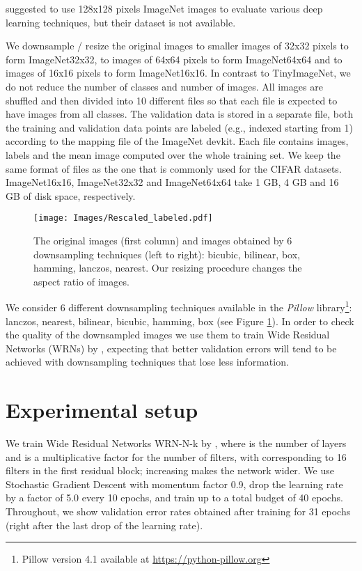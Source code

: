\documentclass{article} \usepackage{iclr2017_conference,times}
\begin{document}
\cite{mishkin2016systematic} suggested to use 128x128 pixels  ImageNet images to evaluate various deep learning  techniques, but their dataset is not available. 

We downsample / resize the original images to smaller images of 32x32 pixels to form ImageNet32x32, to images of 64x64 pixels to form ImageNet64x64 and to images of 16x16 pixels to form ImageNet16x16. In contrast to TinyImageNet, we do not reduce the number of classes and number of images. All images are shuffled and then divided into 10 different files so that each file is expected to have images from all classes. The validation data is stored in a separate file, both the training and validation data points are labeled (e.g., indexed starting from 1) according to the mapping file of the  ImageNet devkit. Each file contains images, labels and the mean image computed over the whole training set. We keep the same format of files as the one that is commonly used for the CIFAR datasets. ImageNet16x16, ImageNet32x32 and ImageNet64x64 take 1 GB, 4 GB  and 16 GB of disk space, respectively.


\begin{figure}[b]
\begin{center}
\texttt{[image: Images/Rescaled\_labeled.pdf]}
\end{center}
\caption{The original images (first column) and images obtained by 6 downsampling techniques (left to right): bicubic, bilinear, box, hamming, lanczos, nearest. Our resizing procedure changes the aspect ratio of images.}
\label{Figure1}
\end{figure}

We consider 6 different downsampling techniques available in the \textit{Pillow} library\footnote{Pillow version 4.1 available at \url{https://python-pillow.org}}: lanczos, nearest, bilinear, bicubic, hamming, box (see Figure \ref{Figure1}). In order to check the quality of the downsampled images we use them to train Wide Residual Networks (WRNs) by \cite{zagoruyko2016wide}, expecting that better validation errors will tend to be achieved with downsampling techniques that lose less information.


\section{Experimental setup}



We train Wide Residual Networks WRN-N-k by \cite{zagoruyko2016wide}, where  is the number of layers and  is a multiplicative factor for the number of filters, with  corresponding to 16 filters in the first residual block; increasing  makes the network wider. We use Stochastic Gradient Descent with momentum factor 0.9, drop the learning rate by a factor of 5.0 every 10 epochs, and train up to a total budget of 40 epochs. Throughout, we show validation error rates obtained after training for 31 epochs (right after the last drop of the learning rate). 
\end{document}
